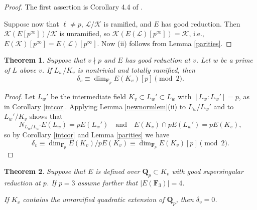 \documentclass[reqno]{amsart}
\newtheorem{thm}{Theorem}[section]
\theoremstyle{definition}
\def\Q{\mathbf{Q}}
\def\F{\mathbf{F}}
\def\Qp{\Q_p}
\def\Fp{\F_p}
\def\K{\mathcal{K}}
\def\L{\mathcal{L}}
\def\rf{\Fp}
\begin{document}
\begin{proof}
The first assertion is Corollary 4.4 of \cite{mazurav}.  

Suppose now that $\ell \ne p$, $\L/\K$ is ramified, 
and $E$ has good reduction.  
Then $\K(E[p^\infty])/\K$ is unramified, so 
$\K(E(\L)[p^\infty]) = \K$, i.e., 
$
E(\K)[p^\infty] = E(\L)[p^\infty].
$
Now (ii) follows from Lemma \ref{parities}. 
\end{proof}

\begin{thm}
\label{par3}
Suppose that $v \nmid p$ and $E$ has good reduction at $v$.  
Let $w$ be a prime of $L$ above $v$.  
If $L_w/K_v$ is nontrivial and totally ramified, then 
$$\delta_v \equiv \dim_{\rf}E(K_v)[p] \pmod{2}.$$
\end{thm}

\begin{proof}
Let $L_w'$ be the intermediate field $K_v \subset L_w' \subset L_w$ 
with $[L_w:L_w'] = p$, as in Corollary \ref{intcor}.  
Applying Lemma \ref{newnormlem}(ii) to $L_w/L_w'$ and to $L_w'/K_v $ 
shows that
$$
N_{L_w/L_w'}E(L_w) = pE(L_w') \quad\text{and}\quad 
    E(K_v) \cap p E(L_w') = p E(K_v),
$$
so by Corollary \ref{intcor} and Lemma \ref{parities} we have 
$$
\delta_v \equiv \dim_{\rf}E(K_v)/p E(K_v) \equiv \dim_{\rf}E(K_v)[p] \pmod{2}.
$$
\end{proof}

\begin{thm}
\label{par5}
Suppose that $E$ is defined over $\Qp \subset K_v$
with good supersingular reduction at $p$.  
If $p = 3$ assume further that $|E(\F_3)| = 4$.

If $K_v$ contains 
the unramified quadratic extension of $\Qp$, then $\delta_v = 0$.
\end{thm}
\end{document}
